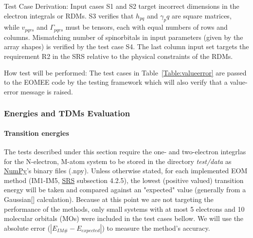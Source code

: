 \documentclass[12pt, titlepage]{article}
\begin{document}
\begin{enumerate}
Test Case Derivation: Input cases S1 and S2 target incorrect dimensions in the 
electron integrals or RDMs. S3 verifies that $h_{pq}$ and $\gamma_pq$ are 
square matrices, while $v_{pqrs}$ and $\Gamma_{pqrs}$ must be tensors, each 
with equal numbers of rows and columns. Mismatching number of spinorbitals in 
input parameters (given by the array shapes) is verified by the test case S4. 
The last column input set targets the requirement R2 in the SRS relative to the 
physical constraints of the RDMs.

How test will be performed: The test cases in Table~\ref{Table:valueerror} are 
passed to the EOMEE code by the testing framework which will also verify that a 
value-error message is raised.

\end{enumerate}

\subsubsection{Energies and TDMs Evaluation}
\label{section:calculations}

\paragraph{Transition energies\\}

The tests described under this section require the one- and 
two-electron integrlas for the N-electron, M-atom system to be stored in the 
directory \textit{test/data} as \href{https://numpy.org/} {NumPy}'s binary 
files (.npy). Unless otherwise 
stated, for each implemented EOM method (IM1-IM5, 
\href{https://github.com/gabrielasd/eomee/tree/cas741/docs/SRS} {SRS} 
subsection 4.2.5), the lowest (positive valued) 
transition energy will be taken and compared against an "expected" value 
(generally from a Gaussian[\cite{g16}] calculation). 
Because at this point we are not targeting the performance of the 
methods, only small systems with at most 5 electrons and 10 molecular orbitals 
(MOs) 
were included in the test cases bellow. We will use the absolute error 
($|E_{IM\#} - E_{expected}|$) to measure the method's accuracy.
\end{document}

